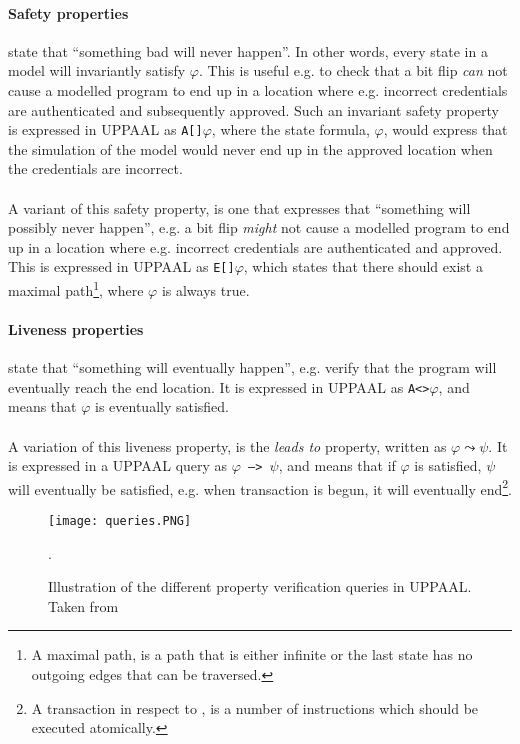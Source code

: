\paragraph{Safety properties} state that ``something bad will never happen''. In other words, every state in a model will invariantly satisfy $\varphi$. This is useful e.g. to check that a bit flip \textit{can} not cause a modelled program to end up in a location where e.g. incorrect credentials are authenticated and subsequently approved. Such an invariant safety property is expressed in UPPAAL as \texttt{A[]$\varphi$}, where the state formula, $\varphi$, would express that the simulation of the model would never end up in the approved location when the credentials are incorrect.\\\\
A variant of this safety property, is one that expresses that ``something will possibly never happen'', e.g. a bit flip \textit{might} not cause a modelled program to end up in a location where e.g. incorrect credentials are authenticated and approved. This is expressed in UPPAAL as \texttt{E[]$\varphi$}, which states that there should exist a maximal path\footnote{A maximal path, is a path that is either infinite or the last state has no outgoing edges that can be traversed.}, where $\varphi$ is always true.
\paragraph{Liveness properties} state that ``something will eventually happen'', e.g. verify that the program will eventually reach the end location. It is expressed in UPPAAL as \texttt{A<>$\varphi$}, and means that $\varphi$ is eventually satisfied.\\\\
A variation of this liveness property, is the \textit{leads to} property, written as $\varphi \leadsto \psi$. It is expressed in a UPPAAL query as \texttt{$\varphi$ --> $\psi$}, and means that if $\varphi$ is satisfied, $\psi$ will eventually be satisfied, e.g. when \jc transaction is begun, it will eventually end\footnote{A transaction in respect to \jc, is a number of instructions which should be executed atomically.}.

\begin{figure}[H]
\centering
\texttt{[image: queries.PNG]}
\caption{Illustration of the different property verification queries in UPPAAL. Taken from~\cite[p. 8]{upptut}}.
\label{fig:query}
\end{figure}

